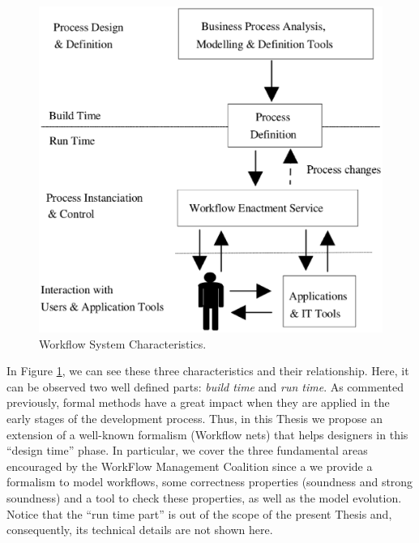 \begin{figure}
\begin{center}
  \includegraphics[scale=0.25]{Figures/wfmsarquitectura.eps}
\end{center}
  \caption{Workflow System Characteristics.}
  \label{fig:wfms}
\end{figure}

In Figure \ref{fig:wfms}, we can see these three characteristics and their relationship. Here, 
it can be observed two well defined parts: \emph{build time} and \emph{run time}. As commented previously, formal methods have a 
great impact when they are applied in the early stages of the development process. Thus, 
in this Thesis we propose an extension of a well-known formalism (Workflow nets)
that helps designers in this ``design time'' phase. In particular, we cover the three fundamental areas encouraged by the WorkFlow Management Coalition since a we provide a formalism to model workflows, some correctness properties (soundness and strong soundness) and a tool to check these properties, as well as the model 
evolution. Notice that the ``run time part'' is out of the scope of the present Thesis and, consequently, its technical details are not shown here.

